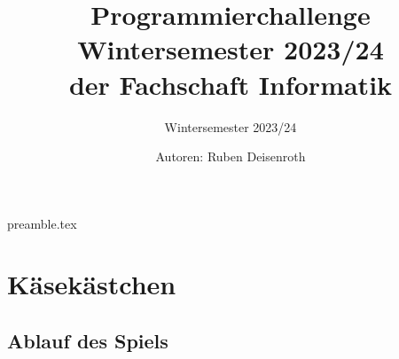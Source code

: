 \RequirePackage{import}
{preamble.tex}

\usepackage{hyperref}
\usepackage{fancyvrb}

\usepackage{csquotes}
\usepackage{tikz}
\usetikzlibrary{fit,backgrounds}


\usepackage[font=normalsize, labelfont=sf, position=bottom]{caption}
\usepackage[labelfont=normalfont, position=bottom]{subcaption}

\setlength{\parindent}{0pt}

\def\gamefont{\bfseries\sffamily}




\title{Programmierchallenge Wintersemester 2023/24 \\ {\small der Fachschaft Informatik}}
\subtitle{Wintersemester 2023/24}
\author{Autoren: Ruben Deisenroth}
\maketitle

\section*{Käsekästchen \hyperref[footnote:1]{\footnotemark[1]}}
\subsection*{Ablauf des Spiels}
